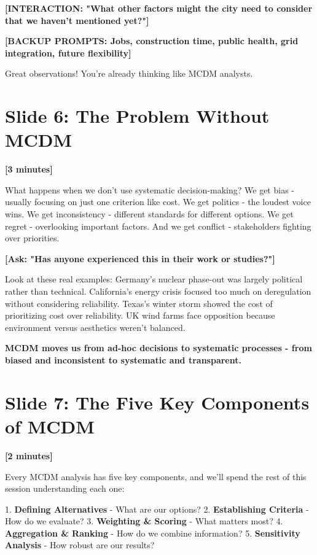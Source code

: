 \documentclass[12pt]{article}
\begin{document}
{{\textcolor{speakernote}{\textbf{[INTERACTION: "What other factors might the city need to consider that we haven't mentioned yet?"]}}

\textcolor{speakernote}{\textbf{[BACKUP PROMPTS: Jobs, construction time, public health, grid integration, future flexibility]}}

Great observations! You're already thinking like MCDM analysts.

\section*{Slide 6: The Problem Without MCDM}
\textcolor{timing}{\textbf{[3 minutes]}}

What happens when we don't use systematic decision-making? We get bias - usually focusing on just one criterion like cost. We get politics - the loudest voice wins. We get inconsistency - different standards for different options. We get regret - overlooking important factors. And we get conflict - stakeholders fighting over priorities.

\textcolor{speakernote}{\textbf{[Ask: "Has anyone experienced this in their work or studies?"]}}

Look at these real examples: Germany's nuclear phase-out was largely political rather than technical. California's energy crisis focused too much on deregulation without considering reliability. Texas's winter storm showed the cost of prioritizing cost over reliability. UK wind farms face opposition because environment versus aesthetics weren't balanced.

\textcolor{emphasis}{\textbf{MCDM moves us from ad-hoc decisions to systematic processes - from biased and inconsistent to systematic and transparent.}}

\section*{Slide 7: The Five Key Components of MCDM}
\textcolor{timing}{\textbf{[2 minutes]}}

Every MCDM analysis has five key components, and we'll spend the rest of this session understanding each one:

1. \textcolor{emphasis}{\textbf{Defining Alternatives}} - What are our options?
2. \textcolor{emphasis}{\textbf{Establishing Criteria}} - How do we evaluate?
3. \textcolor{emphasis}{\textbf{Weighting \& Scoring}} - What matters most?
4. \textcolor{emphasis}{\textbf{Aggregation \& Ranking}} - How do we combine information?
5. \textcolor{emphasis}{\textbf{Sensitivity Analysis}} - How robust are our results?

}}
\end{document}

